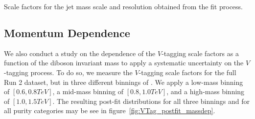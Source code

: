 \begin{table}[htbp]
  \centering
  
  \caption{
    Scale factors for the jet mass scale and resolution obtained from the fit process.
  }
  \label{tab:VScaleRes}
\end{table}

\subsection{Momentum Dependence}

We also conduct a study on the dependence of the $V$-tagging scale factors as a function of the diboson invariant mass \MVV to apply a systematic uncertainty on the $V$-tagging process.
To do so, we measure the $V$-tagging scale factors for the full Run 2 dataset, but in three different binnings of \MVV.
We apply a low-mass binning of $[0.6,0.8\unit{TeV}]$, a mid-mass binning of $[0.8,1.0\unit{TeV}]$, and a high-mass binning of $[1.0,1.5\unit{TeV}]$.
The resulting post-fit distributions for all three binnings and for all purity categories may be see in figure~\ref{fig:VTag_postfit_massdep}.

